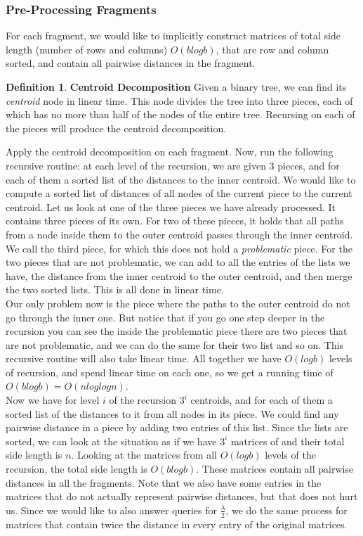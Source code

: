 \documentclass[11pt,a4paper]{article}
\theoremstyle{definition}
\newtheorem{definition}{Definition}
\theoremstyle{remark}
\begin{document}
\subsubsection{Pre-Processing Fragments}
For each fragment, we would like to implicitly construct matrices of total side length (number of rows and columns) $O(blogb)$, that are row and column sorted, and contain all pairwise distances in the fragment.

\begin{definition} \textbf{Centroid Decomposition} %
Given a binary tree, we can find its \textit{centroid} node in linear time. This node divides the tree into three pieces, each of which has no more than half of the nodes of the entire tree. Recursing on each of the pieces will produce the centroid decomposition.
\end{definition}

Apply the centroid decomposition on each fragment. Now, run the following recursive routine: at each level of the recursion, we are given 3 pieces, and for each of them a sorted list of the distances to the inner centroid. We would like to compute a sorted list of distances of all nodes of the current piece to the current centroid. Let us look at one of the three pieces we have already processed. It contains three pieces of its own. For two of these pieces, it holds that all paths from a node inside them to the outer centroid passes through the inner centroid. We call the third piece, for which this does not hold a \textit{problematic} piece. For the two pieces that are not problematic, we can add to all the entries of the lists we have, the distance from the inner centroid to the outer centroid, and then merge the two sorted lists. This is all done in linear time.\\
Our only problem now is the piece where the paths to the outer centroid do not go through the inner one. But notice that if you go one step deeper in the recursion you can see the inside the problematic piece there are two pieces that are not problematic, and we can do the same for their two list and so on. This recursive routine will also take linear time. All together we have $O(logb)$ levels of recursion, and spend linear time on each one, so we get a running time of $O(blogb)=O(nloglogn)$.\\
Now we have for level $i$ of the recursion $3^i$ centroids, and for each of them a sorted list of the distances to it from all nodes in its piece. We could find any pairwise distance in a piece by adding two entries of this list. Since the lists are sorted, we can look at the situation as if we have $3^i$ matrices of and their total side length is $n$. Looking at the matrices from all $O(logb)$ levels of the recursion, the total side length is $O(blogb)$. These matrices contain all pairwise distances in all the fragments. Note that we also have some entries in the matrices that do not actually represent pairwise distances, but that does not hurt us.
Since we would like to also answer queries for $\frac{\lambda}{2}$, we do the same process for matrices that contain twice the distance in every entry of the original matrices.\\
\end{document}
